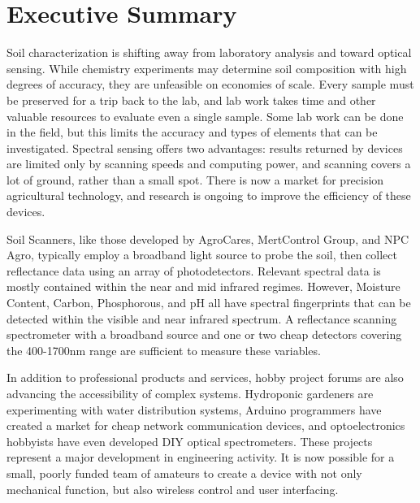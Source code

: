 \documentclass[12pt]{article}
\begin{document}

\tableofcontents
\listoffigures
\listoftables
\pagebreak
{}
%
\section{Executive Summary}                     %
Soil characterization is shifting away from laboratory analysis and toward optical
sensing. While chemistry experiments may determine soil composition with high degrees of accuracy,
they are unfeasible on economies of scale. Every sample must be preserved for a trip back to the lab,
and lab work takes time and other valuable resources to evaluate even a single sample. Some lab work
can be done in the field, but this limits the accuracy and types of elements that can be investigated.
Spectral sensing offers two advantages: results returned by devices are limited only by scanning speeds
and computing power, and scanning covers a lot of ground, rather than a small spot. There is now a
market for precision agricultural technology, and research is ongoing to improve the efficiency of
these devices.

Soil Scanners, like those developed by AgroCares, MertControl Group, and NPC Agro, typically employ
a broadband light source to probe the soil, then collect reflectance data using an array of photodetectors.
Relevant spectral data is mostly contained within the near and mid infrared regimes. However, Moisture
Content, Carbon, Phosphorous, and pH all have spectral fingerprints that can be detected within the visible
and near infrared spectrum. A reflectance scanning spectrometer with a broadband source and one or two
cheap detectors covering the 400-1700nm range are sufficient to measure these variables\cite{Mouazen2007}.

In addition to professional products and services, hobby project forums are also advancing the
accessibility of complex systems. Hydroponic gardeners are experimenting with water distribution systems,
Arduino programmers have created a market for cheap network communication devices, and optoelectronics
hobbyists have even developed DIY optical spectrometers\cite{Cao}. These projects represent a major development in
engineering activity. It is now possible for a small, poorly funded team of amateurs to create a device
with not only mechanical function, but also wireless control and user interfacing.
\newpage
\end{document}
